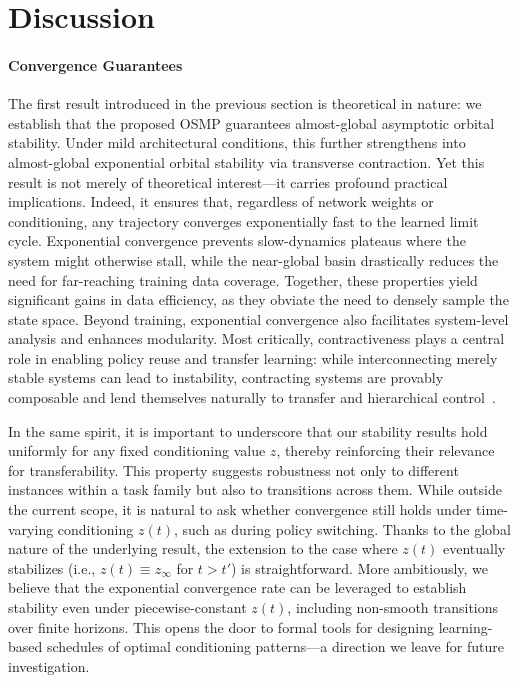 \section{Discussion}\label{sec:osmp:discussion}
\paragraph{Convergence Guarantees}
The first result introduced in the previous section is theoretical in nature: we establish that the proposed \gls{OSMP} guarantees almost-global asymptotic orbital stability. Under mild architectural conditions, this further strengthens into almost-global exponential orbital stability via transverse contraction. Yet this result is not merely of theoretical interest—it carries profound practical implications. Indeed, it ensures that, regardless of network weights or conditioning, any trajectory converges exponentially fast to the learned limit cycle. Exponential convergence prevents slow-dynamics plateaus where the system might otherwise stall, while the near-global basin drastically reduces the need for far-reaching training data coverage. Together, these properties yield significant gains in data efficiency, as they obviate the need to densely sample the state space. Beyond training, exponential convergence also facilitates system-level analysis and enhances modularity. Most critically, contractiveness plays a central role in enabling policy reuse and transfer learning: while interconnecting merely stable systems can lead to instability, contracting systems are provably composable and lend themselves naturally to transfer and hierarchical control~\citep{ofir2022sufficient,angeli2025lmi}. 

In the same spirit, it is important to underscore that our stability results hold uniformly for any fixed conditioning value $z$, thereby reinforcing their relevance for transferability. This property suggests robustness not only to different instances within a task family but also to transitions across them. While outside the current scope, it is natural to ask whether convergence still holds under time-varying conditioning $z(t)$, such as during policy switching. Thanks to the global nature of the underlying result, the extension to the case where $z(t)$ eventually stabilizes (i.e., $z(t) \equiv z_\infty$ for $t > t'$) is straightforward. More ambitiously, we believe that the exponential convergence rate can be leveraged to establish stability even under piecewise-constant $z(t)$, including non-smooth transitions over finite horizons. This opens the door to formal tools for designing learning-based schedules of optimal conditioning patterns—a direction we leave for future investigation.

